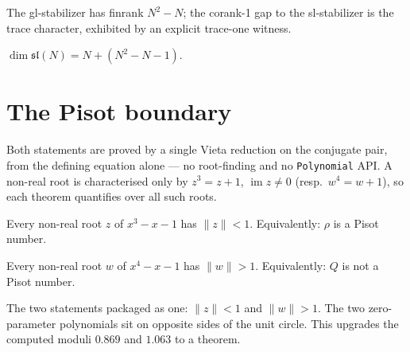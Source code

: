 \begin{theorem}
  \label{thm:corank_one}
  \leanok
  The gl-stabilizer has finrank $N^2-N$; the corank-1 gap to the sl-stabilizer is the trace
  character, exhibited by an explicit trace-one witness.
\end{theorem}

\begin{theorem}
  \label{thm:orbit_stab}
  \leanok
  $\dim \mathfrak{sl}(N) = N + (N^2-N-1)$.
\end{theorem}

\chapter{The Pisot boundary}

Both statements are proved by a single Vieta reduction on the conjugate pair, from the
defining equation alone --- no root-finding and no \lstinline{Polynomial} API. A non-real
root is characterised only by $z^3 = z+1$, $\operatorname{im} z \neq 0$ (resp.\ $w^4 = w+1$),
so each theorem quantifies over all such roots.

\begin{theorem}
  \label{thm:cubic_lt_one}
  \leanok
  Every non-real root $z$ of $x^3-x-1$ has $\|z\| < 1$. Equivalently: $\rho$ is a Pisot
  number.
\end{theorem}

\begin{theorem}
  \label{thm:quartic_gt_one}
  \leanok
  Every non-real root $w$ of $x^4-x-1$ has $\|w\| > 1$. Equivalently: $Q$ is not a Pisot
  number.
\end{theorem}

\begin{theorem}
  \label{thm:pisot_dichotomy}
  \leanok
  The two statements packaged as one: $\|z\| < 1$ and $\|w\| > 1$. The two zero-parameter
  polynomials sit on opposite sides of the unit circle. This upgrades the computed moduli
  $0.869$ and $1.063$ to a theorem.
\end{theorem}


